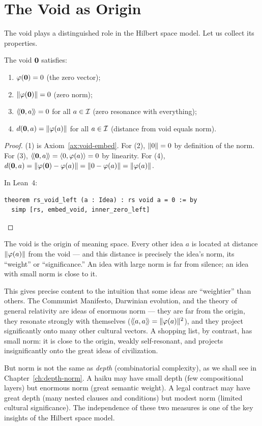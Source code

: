 \section{The Void as Origin}

The void plays a distinguished role in the Hilbert space model. Let us collect
its properties.

\begin{proposition}
\label{prop:void-properties}
The void $\mathbf{0}$ satisfies:
\begin{enumerate}
\item $\varphi(\mathbf{0}) = 0$ (the zero vector);
\item $\lVert \varphi(\mathbf{0}) \rVert = 0$ (zero norm);
\item $\langle\!\langle \mathbf{0}, a \rangle\!\rangle = 0$ for all $a \in \mathcal{I}$ (zero resonance with everything);
\item $d(\mathbf{0}, a) = \lVert \varphi(a) \rVert$ for all $a \in \mathcal{I}$ (distance from void
equals norm).
\end{enumerate}
\end{proposition}

\begin{proof}
(1) is Axiom~\ref{ax:void-embed}. For (2), $\lVert 0 \rVert = 0$ by definition of
the norm. For (3), $\langle\!\langle \mathbf{0}, a \rangle\!\rangle = \langle 0, \varphi(a) \rangle = 0$ by linearity. For
(4), $d(\mathbf{0}, a) = \lVert \varphi(\mathbf{0}) - \varphi(a) \rVert = \lVert 0 - \varphi(a) \rVert =
\lVert \varphi(a) \rVert$.

In Lean~4:
\begin{lstlisting}
theorem rs_void_left (a : Idea) : rs void a = 0 := by
  simp [rs, embed_void, inner_zero_left]
\end{lstlisting}
\end{proof}

\begin{interpretation}
\label{interp:silence}
The void is the origin of meaning space. Every other idea $a$ is located at
distance $\lVert \varphi(a) \rVert$ from the void --- and this distance is precisely
the idea's norm, its ``weight'' or ``significance.'' An idea with large norm
is far from silence; an idea with small norm is close to it.

This gives precise content to the intuition that some ideas are ``weightier''
than others. The Communist Manifesto, Darwinian evolution, and the theory of
general relativity are ideas of enormous norm --- they are far from the origin,
they resonate strongly with themselves ($\langle\!\langle a, a \rangle\!\rangle = \lVert \varphi(a) \rVert^2$), and
they project significantly onto many other cultural vectors. A shopping list,
by contrast, has small norm: it is close to the origin, weakly self-resonant,
and projects insignificantly onto the great ideas of civilization.

But norm is not the same as \emph{depth} (combinatorial complexity), as we
shall see in Chapter~\ref{ch:depth-norm}. A haiku may have small depth (few
compositional layers) but enormous norm (great semantic weight). A legal
contract may have great depth (many nested clauses and conditions) but modest
norm (limited cultural significance). The independence of these two measures is
one of the key insights of the Hilbert space model.
\end{interpretation}


